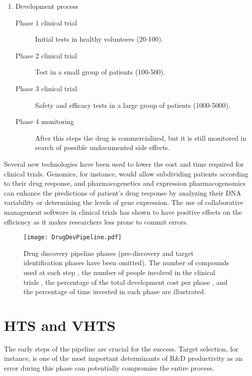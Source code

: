\begin {enumerate}
\item Development process
\begin{description}
\item [Phase 1 clinical trial] Initial tests in healthy volunteers (20-100).
\item [Phase 2 clinical trial] Test in a small group of patients (100-500).
\item [Phase 3 clinical trial] Safety and efficacy tests in a large group of patients (1000-5000).
\item [Phase 4 monitoring] After this steps the drug is commercialized, but it is still monitored in search of possible undocumented side effects.
\end{description}
\end {enumerate}

Several new technologies have been used to lower the cost and time required for clinical trials. Genomics, for instance, would allow subdividing patients according to their drug response, and pharmacogenetics and expression pharmacogenomics can enhance the predictions of patient's drug response by analyzing their DNA variability or determining the levels of gene expression.
The use of collaborative management software in clinical trials has shown to have positive effects on the efficiency as it makes researchers less prone to commit errors.

\begin{sidewaysfigure}
    \centering
    \texttt{[image: DrugDevPipeline.pdf]}    
    \caption{Drug discovery pipeline phases (pre-discovery and target identification phases have been omitted). The number of compounds used at each step \cite{efpia_pharmaceutical_2014, phrma_2013_2013}, the number of people involved in the clinical trials \cite{phrma_2013_2013}, the percentage of the total development cost per phase \cite{paul_how_2010}, and the percentage of time invested in each phase \cite{dimasi_cost_2015, light_demythologizing_2011, austin_research_2006} are illustrated.}
    \label{fig:drug_dev_pipeline}
\end{sidewaysfigure}

\section{HTS and VHTS}

The early steps of the pipeline are crucial for the success. Target selection, for instance, is one of the most important determinants of R\&D productivity as an error during this phase can potentially compromise the entire process.  

